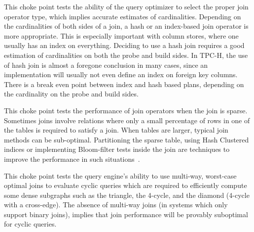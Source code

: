 



This choke point tests the ability of the query optimizer to select the proper join operator type, which implies accurate estimates of cardinalities.
Depending on the cardinalities of both sides of a join, a hash or an index-based join operator is more appropriate.
This is especially important with column stores, where one usually has an index on everything. Deciding to use a hash join requires a good estimation of cardinalities on both the probe and build sides.
In TPC-H, the use of hash join is almost a foregone conclusion in many cases, since an implementation will usually not even define an index on foreign key columns.
There is a break even point between index and hash based plans, depending on the cardinality on the probe and build sides.





This choke point tests the performance of join operators when the join is sparse. Sometimes joins involve relations where only a small percentage of rows in one of the tables is required to satisfy a join. When tables are larger, typical join methods can be sub-optimal. Partitioning the sparse table, using Hash Clustered indices or implementing Bloom-filter tests inside the join are techniques to improve the performance in such situations~\cite{DBLP:journals/csur/Graefe93}.





This choke point tests the query engine's ability to use multi-way, worst-case optimal joins to evaluate cyclic queries which are required to efficiently compute some dense subgraphs such as the triangle, the 4-cycle, and the diamond (4-cycle with a cross-edge).
The absence of multi-way joins (\eg in systems which only support binary joins), implies that join performance will be provably suboptimal for cyclic queries.

